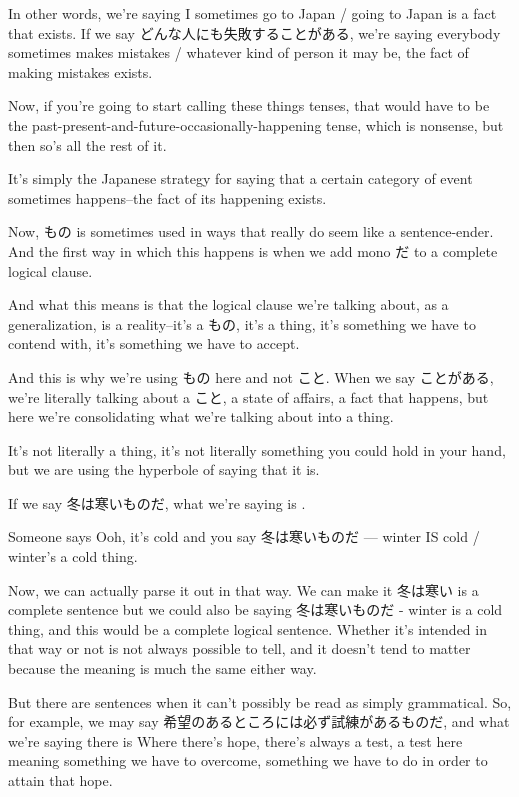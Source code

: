 In other words, we're saying I sometimes go to Japan / going to Japan is a fact that exists. If we say どんな人にも失敗することがある, we're saying everybody sometimes makes mistakes / whatever kind of person it may be, the fact of making mistakes exists.

Now, if you're going to start calling these things tenses, that would have to be the past-present-and-future-occasionally-happening tense, which is nonsense, but then so's all the rest of it.

{}

It's simply the Japanese strategy for saying that a certain category of event sometimes happens--the fact of its happening exists.

Now, もの is sometimes used in ways that really do seem like a sentence-ender. And the first way in which this happens is when we add mono だ to a complete logical clause.

And what this means is that the logical clause we're talking about, as a generalization, is a reality--it's a もの, it's a thing, it's something we have to contend with, it's something we have to accept.

{}

And this is why we're using もの here and not こと. When we say ことがある, we're literally talking about a こと, a state of affairs, a fact that happens, but here we're consolidating what we're talking about into a thing.

It's not literally a thing, it's not literally something you could hold in your hand, but we are using the hyperbole of saying that it is.

If we say 冬は寒いものだ, what we're saying is .

Someone says Ooh, it's cold and you say 冬は寒いものだ --- winter IS cold / winter's a cold thing.

{}

Now, we can actually parse it out in that way. We can make it 冬は寒い is a complete sentence but we could also be saying 冬は寒いものだ - winter is a cold thing, and this would be a complete logical sentence. Whether it's intended in that way or not is not always possible to tell, and it doesn't tend to matter because the meaning is much the same either way.

But there are sentences when it can't possibly be read as simply grammatical. So, for example, we may say 希望のあるところには必ず試練があるものだ, and what we're saying there is Where there's hope, there's always a test, a test here meaning something we have to overcome, something we have to do in order to attain that hope.

